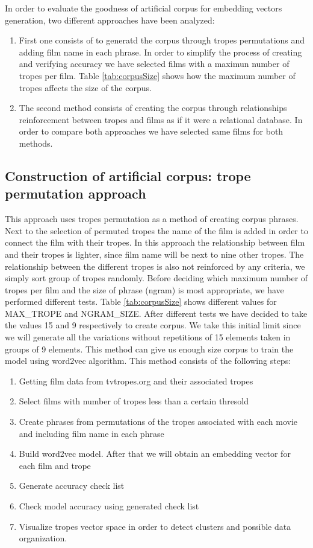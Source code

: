 \documentclass[letterpaper]{article}
\begin{document}
	In order to evaluate the goodness of artificial corpus for embedding vectors generation, two different approaches have been analyzed:
	\begin{enumerate}
		\item First one consists of to generatd the corpus through tropes permutations and adding film name in each phrase. In order to simplify the process of creating and verifying accuracy we have selected films with a maximun number of tropes per film. Table \ref{tab:corpusSize} shows how the maximum number of tropes affects the size of the corpus.
		
        \item The second method consists of creating the corpus through relationships reinforcement between tropes and films as if it were a relational database. In order to compare both approaches we have selected same films for both methods.
	 \end{enumerate}
 
    \subsection{Construction of artificial corpus: trope permutation approach}
    
    This approach uses tropes permutation as a method of creating corpus phrases. Next to the selection of permuted tropes the name of the film is added in order to connect the film with their tropes. In this approach the relationship between film and their tropes is lighter, since film name will be next to nine other tropes. The relationship between the different tropes is also not reinforced by any criteria, we simply sort group of tropes randomly. Before deciding which maximum number of tropes per film and the size of phrase (ngram) is most appropriate, we have performed different tests. Table \ref{tab:corpusSize} shows different values for MAX\_TROPE and NGRAM\_SIZE. After different tests we have decided to take the values 15 and 9 respectively to create corpus. We take this
    initial limit since we will generate all the variations
    without repetitions of 15 elements taken in groups of 9
    elements. This method can give us enough size corpus to train
    the model using word2vec algorithm. This method consists of the following steps:
	
	\begin{enumerate}
		\item Getting film data from tvtropes.org and their associated tropes
		\item Select films with number of tropes less than a certain thresold
		\item Create phrases from permutations of the tropes associated with each movie and including film name in each phrase
		\item Build word2vec model. After that we will obtain an embedding vector for each film and trope
		\item Generate accuracy check list 
		\item Check model accuracy using generated check list
		\item Visualize tropes vector space in order to detect clusters and possible data organization.
    \end{enumerate}
\end{document}
